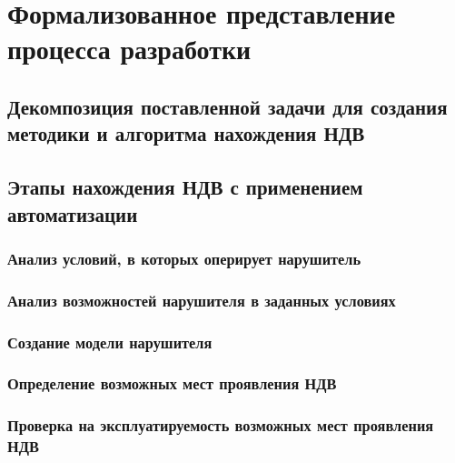 \chapter{Формализованное представление процесса разработки}\label{ch:ch2}
\section{Декомпозиция поставленной задачи для создания методики и алгоритма нахождения НДВ}\label{sec:ch2/sec1}

\section{Этапы нахождения НДВ с применением автоматизации}\label{sec:ch2/sec2}

\subsection{Анализ условий, в которых оперирует нарушитель}\label{sec:ch2/sec2/sub1}

\subsection{Анализ возможностей нарушителя в заданных условиях}\label{sec:ch2/sec2/sub2}

\subsection{Создание модели нарушителя}\label{sec:ch2/sec2/sub3}

\subsection{Определение возможных мест проявления НДВ}\label{sec:ch2/sec2/sub4}

\subsection{Проверка на эксплуатируемость возможных мест проявления НДВ}\label{sec:ch2/sec2/sub5}

